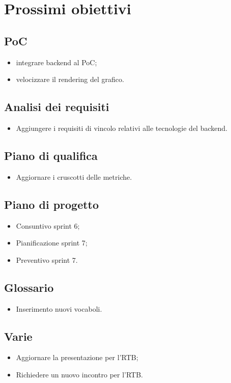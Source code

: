 \section{Prossimi obiettivi}

\subsection{PoC}
\begin{itemize}
    \item integrare backend al PoC;
    \item velocizzare il rendering del grafico.
\end{itemize}

\subsection{Analisi dei requisiti}
\begin{itemize}
    \item  Aggiungere i requisiti di vincolo relativi alle tecnologie del backend.
\end{itemize}

\subsection{Piano di qualifica}
\begin{itemize}
    \item Aggiornare i cruscotti delle metriche.
\end{itemize}

\subsection{Piano di progetto}
\begin{itemize}
    \item Consuntivo sprint 6;
    \item Pianificazione sprint 7;
    \item Preventivo sprint 7.
\end{itemize}

\subsection{Glossario}
\begin{itemize}
    \item Inserimento nuovi vocaboli.
\end{itemize}

\subsection{Varie}
\begin{itemize}
    \item Aggiornare la presentazione per l'RTB;
    \item Richiedere un nuovo incontro per l'RTB.
\end{itemize}